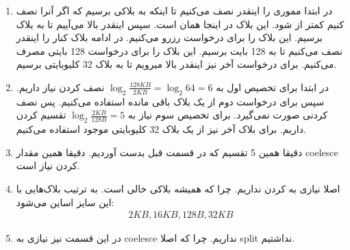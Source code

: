 \begin{enumerate}
    \item در ابتدا مموری را اینقدر نصف می‌کنیم تا اینکه به بلاکی برسیم که اگر آنرا نصف کنیم کمتر از
    شود. این بلاک در اینجا همان
    است. سپس اینقدر بالا می‌آییم تا به بلاک
    برسیم. این بلاک را برای درخواست
    رزرو می‌کنیم.
    در ادامه بلاک کنار
    را اینقدر نصف می‌کنیم تا به 128 بایت برسیم. این بلاک را برای درخواست
    128 بایتی مصرف می‌کنیم.
    برای درخواست آخر نیز اینقدر بالا میرویم تا به بلاک
    32 کلیوبایتی برسیم.
    \item در ابتدا برای تخصیص اول به $\log_2{\frac{128 KB}{2 KB}} = \log_2{64} = 6$
    نصف کردن نیاز داریم.
    سپس برای درخواست دوم از
    یک بلاک
    باقی مانده استفاده می‌کنیم. پس نصف کردنی صورت نمی‌گیرد.
    برای تخصیص سوم نیاز به
    $\log_2{\frac{2 KB}{128 B}} = 5$
    تقسیم کردن داریم. برای بلاک آخر نیز از یک بلاک 32 کلیوبایتی موجود استفاده می‌کنیم.
    \item دقیقا همین 5 تقسیم که در قسمت قبل بدست آوردیم. دقیقا همین مقدار coelesce کردن نیاز است.
    \item اصلا نیازی به  کردن نداریم.
    چرا که همیشه بلاکی خالی است. به ترتیب بلاک‌هایی با این سایز اساین می‌شود:
    \begin{gather*}
        2KB, 16KB, 128B, 32KB
    \end{gather*}
    \item در این قسمت نیز نیازی به coelesce نداریم. چرا که اصلا split نداشتیم.
\end{enumerate}


